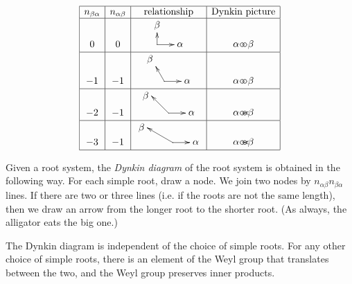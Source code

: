  \[\begin{array}{|c|c|c|c|} \hline
   n_{\beta\alpha} & n_{\alpha\beta} & \text{relationship} & \text{Dynkin picture} \\ \hline
   0 & 0 & \begin{xy}
  <1.75em,0em>:
  (0,0);
  \ar (1,0) *+!L{\alpha},
  \ar (0,0.7) *+!D{\beta},
\end{xy} & \begin{xy}
   (0,0) *+!R{\alpha} *\cir<2pt>{};
   (1,0) *+!L{\beta} *\cir<2pt>{};
 \end{xy}\\ \hline
   -1 & -1 & \begin{xy}
  <1.75em,0em>:
  (0,0);
  \ar (1,0) *+!L{\alpha},
  \ar (-.5,\halfrootthree) *+!DR{\beta},
\end{xy} & \begin{xy}
   (0,0) *+!R{\alpha} *\cir<2pt>{};
   (1,0) *+!L{\beta} *\cir<2pt>{} **@{-};
 \end{xy}\\ \hline
   -2 & -1 & \begin{xy}
  <1.75em,0em>:
  (0,0);
  \ar (1,0) *+!L{\alpha},
  \ar (-1,1) *+!R{\beta},
\end{xy} & \begin{xy}
   (0,0) *+!R{\alpha} *\cir<2pt>{};
   (1,0) *+!L{\beta} *\cir<2pt>{} **@{=} ?*@{<};
 \end{xy}\\ \hline
   -3 & -1 &  \begin{xy}
  <1.75em,0em>:
  (0,0);
  \ar (1,0) *+!L{\alpha},
  \ar (-1,0)+a(120) *+!R{\beta},
\end{xy} & \begin{xy}
   (0,0)="1" *+!R{\alpha} *\cir<2pt>{};
   (1,0)="2" *+!L{\beta} *\cir<2pt>{} **@{-} ?*@{<},
   \ar@{-} "1" *{\hspace{3pt}};"2" *{\hspace{3pt}} <1.5pt>
   \ar@{-} "1" *{\hspace{3pt}};"2" *{\hspace{3pt}} <-1.5pt>
 \end{xy}\\ \hline
 \end{array}\]
 \begin{definition}
   Given a root system, the \emph{Dynkin diagram} of the
   root system is obtained in the following way.  For each simple root, draw a node.
   We join two nodes by $n_{\alpha\beta}n_{\beta\alpha}$ lines. If there are two or
   three lines (i.e. if the roots are not the same length), then we draw an arrow from
   the longer root to the shorter root. (As always, the alligator eats the big one.)
 \end{definition}
 The Dynkin diagram is independent of the choice of simple roots. For any other choice
 of simple roots, there is an element of the Weyl group that translates between the
 two, and the Weyl group preserves inner products.


